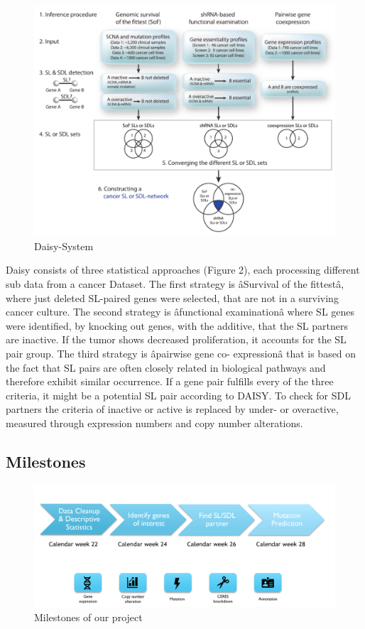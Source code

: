 \documentclass[]{article}
\begin{document}
\begin{figure}
\centering
\includegraphics{images/Daisy.png}
\caption{Daisy-System}
\end{figure}

Daisy consists of three statistical approaches (Figure 2), each
processing different sub data from a cancer Dataset. The first strategy
is âSurvival of the fittestâ, where just deleted SL-paired genes
were selected, that are not in a surviving cancer culture. The second
strategy is âfunctional examinationâ where SL genes were identified,
by knocking out genes, with the additive, that the SL partners are
inactive. If the tumor shows decreased proliferation, it accounts for
the SL pair group. The third strategy is âpairwise gene co-
expressionâ that is based on the fact that SL pairs are often closely
related in biological pathways and therefore exhibit similar occurrence.
If a gene pair fulfills every of the three criteria, it might be a
potential SL pair according to DAISY. To check for SDL partners the
criteria of inactive or active is replaced by under- or overactive,
measured through expression numbers and copy number alterations.

\subsection{Milestones}\label{milestones}

\begin{figure}
\centering
\includegraphics{images/milestones.png}
\caption{Milestones of our project}
\end{figure}
\end{document}
